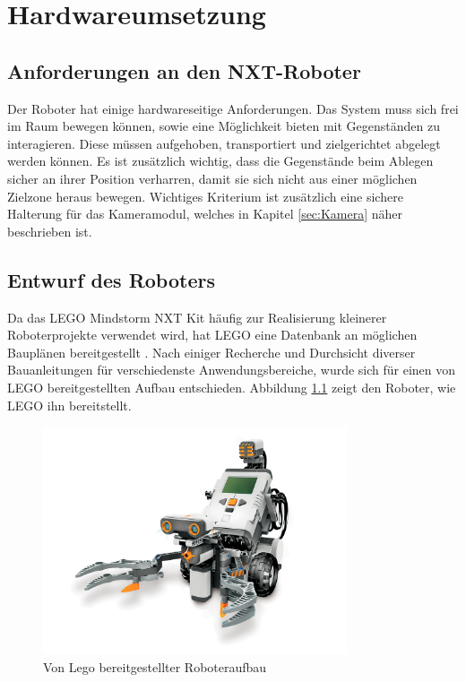 \chapter{Hardwareumsetzung}
\label{cha:robot}
\section{Anforderungen an den NXT-Roboter}

Der Roboter hat einige hardwareseitige Anforderungen. Das System muss sich frei im Raum bewegen können, sowie eine Möglichkeit bieten mit Gegenständen zu interagieren. Diese müssen aufgehoben, transportiert und zielgerichtet abgelegt werden können. Es ist zusätzlich wichtig, dass die Gegenstände beim Ablegen sicher an ihrer Position verharren, damit sie sich nicht aus einer möglichen Zielzone heraus bewegen. Wichtiges Kriterium ist zusätzlich eine sichere Halterung für das Kameramodul, welches in Kapitel \ref{sec:Kamera} näher beschrieben ist.

\section{Entwurf des Roboters}

Da das LEGO Mindstorm NXT Kit häufig zur Realisierung kleinerer Roboterprojekte verwendet wird, hat LEGO eine Datenbank an möglichen Bauplänen bereitgestellt \cite{building_instructions}. Nach einiger Recherche und Durchsicht diverser Bauanleitungen für verschiedenste Anwendungsbereiche, wurde sich für einen von LEGO bereitgestellten Aufbau entschieden. Abbildung \ref{fig:standardRoboter} zeigt den Roboter, wie LEGO ihn bereitstellt.

\begin{figure}[h]
\centering
\includegraphics[width=0.8\textwidth]{Bilder/Robot/nxt_default}
\caption{Von Lego bereitgestellter Roboteraufbau}
\label{fig:standardRoboter}
\end{figure}


